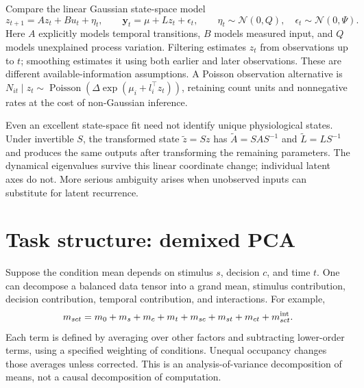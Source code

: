 Compare the linear Gaussian state-space model
\begin{equation}
 z_{t+1}=Az_t+Bu_t+\eta_t,\qquad
 \mathbf y_t=\mu+Lz_t+\epsilon_t,\qquad
 \eta_t\sim\mathcal N(0,Q),\quad\epsilon_t\sim\mathcal N(0,\Psi).
 \label{eq:06-lds}
\end{equation}
Here $A$ explicitly models temporal transitions, $B$ models measured input, and $Q$ models unexplained process variation. Filtering estimates $z_t$ from observations up to $t$; smoothing estimates it using both earlier and later observations. These are different available-information assumptions. A Poisson observation alternative is $N_{it}\mid z_t\sim\operatorname{Poisson}(\Delta\exp(\mu_i+l_i^\top z_t))$, retaining count units and nonnegative rates at the cost of non-Gaussian inference.

Even an excellent state-space fit need not identify unique physiological states. Under invertible $S$, the transformed state $\tilde z=Sz$ has $\tilde A=SAS^{-1}$ and $\tilde L=LS^{-1}$ and produces the same outputs after transforming the remaining parameters. The dynamical eigenvalues survive this linear coordinate change; individual latent axes do not. More serious ambiguity arises when unobserved inputs can substitute for latent recurrence.

\section{Task structure: demixed PCA}
Suppose the condition mean depends on stimulus $s$, decision $c$, and time $t$. One can decompose a balanced data tensor into a grand mean, stimulus contribution, decision contribution, temporal contribution, and interactions. For example,
\[
 m_{sct}=m_0+m_s+m_c+m_t+m_{sc}+m_{st}+m_{ct}+m_{sct}^{\rm int}.
\]
Each term is defined by averaging over other factors and subtracting lower-order terms, using a specified weighting of conditions. Unequal occupancy changes those averages unless corrected. This is an analysis-of-variance decomposition of means, not a causal decomposition of computation.

